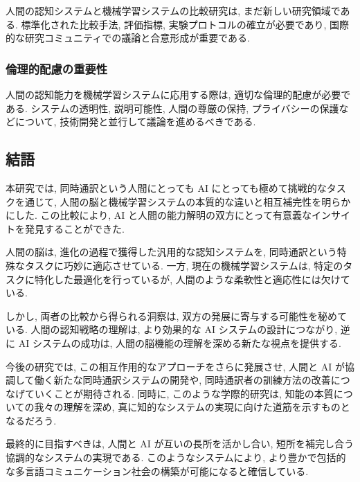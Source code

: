 人間の認知システムと機械学習システムの比較研究は, まだ新しい研究領域である.
標準化された比較手法, 評価指標, 実験プロトコルの確立が必要であり, 国際的な研究コミュニティでの議論と合意形成が重要である.

\subsubsection{倫理的配慮の重要性}

人間の認知能力を機械学習システムに応用する際は, 適切な倫理的配慮が必要である.
システムの透明性, 説明可能性, 人間の尊厳の保持, プライバシーの保護などについて, 技術開発と並行して議論を進めるべきである.

\subsection{結語}

本研究では, 同時通訳という人間にとっても AI にとっても極めて挑戦的なタスクを通じて, 人間の脳と機械学習システムの本質的な違いと相互補完性を明らかにした.
この比較により, AI と人間の能力解明の双方にとって有意義なインサイトを発見することができた.

人間の脳は, 進化の過程で獲得した汎用的な認知システムを, 同時通訳という特殊なタスクに巧妙に適応させている.
一方, 現在の機械学習システムは, 特定のタスクに特化した最適化を行っているが, 人間のような柔軟性と適応性には欠けている.

しかし, 両者の比較から得られる洞察は, 双方の発展に寄与する可能性を秘めている.
人間の認知戦略の理解は, より効果的な AI システムの設計につながり, 逆に AI システムの成功は, 人間の脳機能の理解を深める新たな視点を提供する.

今後の研究では, この相互作用的なアプローチをさらに発展させ, 人間と AI が協調して働く新たな同時通訳システムの開発や, 同時通訳者の訓練方法の改善につなげていくことが期待される.
同時に, このような学際的研究は, 知能の本質についての我々の理解を深め, 真に知的なシステムの実現に向けた道筋を示すものとなるだろう.

最終的に目指すべきは, 人間と AI が互いの長所を活かし合い, 短所を補完し合う協調的なシステムの実現である.
このようなシステムにより, より豊かで包括的な多言語コミュニケーション社会の構築が可能になると確信している.

